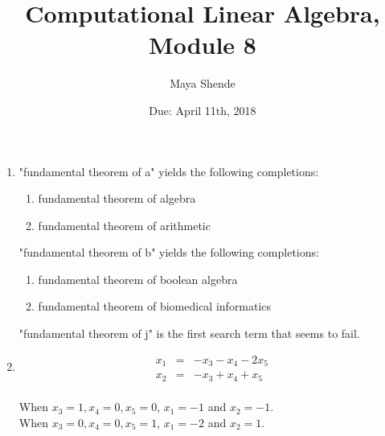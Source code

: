 \documentclass{article}
\title{Computational Linear Algebra, Module 8}
\author{Maya Shende}
\date{Due: April 11th, 2018}
\begin{document}
\maketitle

\begin{enumerate}

\item "fundamental theorem of a" yields the following completions:
\begin{enumerate}
	\item fundamental theorem of algebra
	\item fundamental theorem of arithmetic
\end{enumerate}
"fundamental theorem of b" yields the following completions:
\begin{enumerate}
	\item fundamental theorem of boolean algebra
	\item fundamental theorem of biomedical informatics
\end{enumerate}
"fundamental theorem of j" is the first search term that seems to fail.

\item 
\begin{eqnarray*}
	x_1 &=& -x_3 - x_4 - 2x_5\\
	x_2 &=& -x_3 + x_4 + x_5
\end{eqnarray*}\\
When $x_3 = 1, x_4 = 0, x_5 = 0$, $x_1 = -1$ and $x_2 = -1$. \\
When $x_3 = 0, x_4 = 0, x_5 = 1$, $x_1 = -2$ and $x_2 = 1$. 


\end{enumerate}
\end{document}
